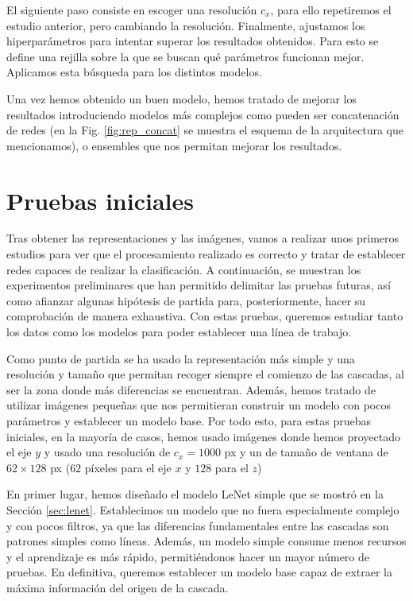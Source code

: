 \documentclass[a4paper,12pt,oneside,titlepage]{book}
\begin{document}
El siguiente paso consiste en escoger una resolución $c_x$, para ello repetiremos el estudio anterior, pero cambiando la resolución. Finalmente, ajustamos los hiperparámetros para intentar superar los resultados obtenidos. Para esto se define una rejilla sobre la que se buscan qué parámetros funcionan mejor. Aplicamos esta búsqueda para los distintos modelos.
 
Una vez hemos obtenido un buen modelo, hemos tratado de mejorar los resultados introduciendo modelos más complejos como pueden ser concatenación de redes (en la Fig. \ref{fig:rep_concat} se muestra el esquema de la arquitectura que mencionamos), o ensembles que nos permitan mejorar los resultados.


\section{Pruebas iniciales}
\label{sec:pruebas_iniciales}

Tras obtener las representaciones y las imágenes, vamos a realizar unos primeros estudios para ver que el procesamiento realizado es correcto y tratar de establecer redes capaces de realizar la clasificación. A continuación, se muestran los experimentos preliminares que han permitido delimitar las pruebas futuras, así como afianzar algunas hipótesis de partida para, posteriormente, hacer su comprobación de manera exhaustiva. Con estas pruebas, queremos estudiar tanto los datos como los modelos para poder establecer una línea de trabajo.
 
Como punto de partida se ha usado la representación más simple y una resolución y tamaño que permitan recoger siempre el comienzo de las cascadas, al ser la zona donde más diferencias se encuentran. Además, hemos tratado de utilizar imágenes pequeñas que nos permitieran construir un modelo con pocos parámetros y establecer un modelo base. Por todo esto, para estas pruebas iniciales, en la mayoría de casos, hemos usado imágenes donde hemos proyectado el eje $y$ y usado una resolución de $c_x = 1000$ px y un de tamaño de ventana de $62 \times 128$ px ($62$ píxeles para el eje $x$ y $128$ para el $z$)
 
En primer lugar, hemos diseñado el modelo LeNet simple que se mostró en la Sección \ref{sec:lenet}. Establecimos un modelo que no fuera especialmente complejo y con pocos filtros, ya que las diferencias fundamentales entre las cascadas son patrones simples como líneas. Además, un modelo simple consume menos recursos y el aprendizaje es más rápido, permitiéndonos hacer un mayor número de pruebas. En definitiva, queremos establecer un modelo base capaz de extraer la máxima información del origen de la cascada.
 
\end{document}
